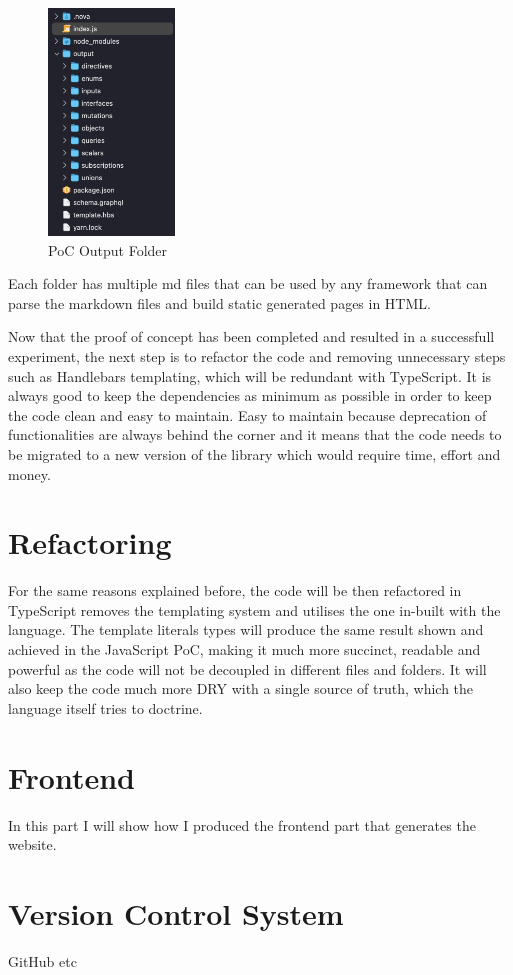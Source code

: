 \begin{figure}[H]
  \centering
  \includegraphics[width=0.3\textwidth]{figures/folders}
  \caption{PoC Output Folder}
  \label{f:ch5-poc-output-folder}
\end{figure}

Each folder has multiple md files that can be used by any framework that can
parse the markdown files and build static generated pages in HTML.

Now that the proof of concept has been completed and resulted in a successfull
experiment, the next step is to refactor the code and removing unnecessary steps
such as Handlebars templating, which will be redundant with TypeScript. It is
always good to keep the dependencies as minimum as possible in order to keep the
code clean and easy to maintain. Easy to maintain because deprecation of
functionalities are always behind the corner and it means that the code needs to
be migrated to a new version of the library which would require time, effort and
money.

\section{Refactoring}
\label{s:Refactoring}
For the same reasons explained before, the code will be then refactored in
TypeScript removes the templating system and utilises the one in-built with the
language. The template literals types will produce the same result shown and
achieved in the JavaScript PoC, making it much more succinct, readable and
powerful as the code will not be decoupled in different files and folders. It
will also keep the code much more DRY with a single source of truth, which the
language itself tries to doctrine.

\section{Frontend}
\label{s:Frontend}
In this part I will show how I produced the frontend part that generates the
website.

\section{Version Control System}
\label{s:Version-Control-System}
GitHub etc

